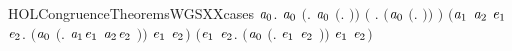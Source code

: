 \newcommand{\HOLCongruenceTheoremsWGSSeven}{\UseVerbatim{HOLCongruenceTheoremsWGSSeven}}
\begin{SaveVerbatim}{HOLCongruenceTheoremsWGSXXcases}
\HOLTokenTurnstile{} \HOLSymConst{\HOLTokenForall{}}\ensuremath{\HOLBoundVar{a}\sb{\mathrm{0}}}.
        \ensuremath{\HOLBoundVar{a}\sb{\mathrm{0}}} \HOLSymConst{\HOLTokenEquiv{}}
       \ensuremath{(}\HOLSymConst{\HOLTokenExists{}}. \ensuremath{\HOLBoundVar{a}\sb{\mathrm{0}}} \HOLSymConst{\ensuremath{=}} \ensuremath{(}\HOLTokenLambda{}. \ensuremath{)}\ensuremath{)} \HOLSymConst{\HOLTokenDisj{}}
       \ensuremath{(}\HOLSymConst{\HOLTokenExists{}} . \ensuremath{(}\ensuremath{\HOLBoundVar{a}\sb{\mathrm{0}}} \HOLSymConst{\ensuremath{=}} \ensuremath{(}\HOLTokenLambda{}. \HOLSymConst{\ensuremath{\ldotp}} \ensuremath{)}\ensuremath{)} \HOLSymConst{\HOLTokenConj{}}  \ensuremath{)} \HOLSymConst{\HOLTokenDisj{}}
       \ensuremath{(}\HOLSymConst{\HOLTokenExists{}}\ensuremath{\HOLBoundVar{a}\sb{\mathrm{1}}} \ensuremath{\HOLBoundVar{a}\sb{\mathrm{2}}} \ensuremath{\HOLBoundVar{e}\sb{\mathrm{1}}} \ensuremath{\HOLBoundVar{e}\sb{\mathrm{2}}}.
            \ensuremath{(}\ensuremath{\HOLBoundVar{a}\sb{\mathrm{0}}} \HOLSymConst{\ensuremath{=}} \ensuremath{(}\HOLTokenLambda{}. \ensuremath{\HOLBoundVar{a}\sb{\mathrm{1}}}\HOLSymConst{\ensuremath{\ldotp}}\ensuremath{\HOLBoundVar{e}\sb{\mathrm{1}}}  \HOLSymConst{\ensuremath{+}} \ensuremath{\HOLBoundVar{a}\sb{\mathrm{2}}}\HOLSymConst{\ensuremath{\ldotp}}\ensuremath{\HOLBoundVar{e}\sb{\mathrm{2}}} \ensuremath{)}\ensuremath{)} \HOLSymConst{\HOLTokenConj{}}  \ensuremath{\HOLBoundVar{e}\sb{\mathrm{1}}} \HOLSymConst{\HOLTokenConj{}}
             \ensuremath{\HOLBoundVar{e}\sb{\mathrm{2}}}\ensuremath{)} \HOLSymConst{\HOLTokenDisj{}}
       \ensuremath{(}\HOLSymConst{\HOLTokenExists{}}\ensuremath{\HOLBoundVar{e}\sb{\mathrm{1}}} \ensuremath{\HOLBoundVar{e}\sb{\mathrm{2}}}. \ensuremath{(}\ensuremath{\HOLBoundVar{a}\sb{\mathrm{0}}} \HOLSymConst{\ensuremath{=}} \ensuremath{(}\HOLTokenLambda{}. \ensuremath{\HOLBoundVar{e}\sb{\mathrm{1}}}  \HOLSymConst{\ensuremath{\mid}} \ensuremath{\HOLBoundVar{e}\sb{\mathrm{2}}} \ensuremath{)}\ensuremath{)} \HOLSymConst{\HOLTokenConj{}}  \ensuremath{\HOLBoundVar{e}\sb{\mathrm{1}}} \HOLSymConst{\HOLTokenConj{}}  \ensuremath{\HOLBoundVar{e}\sb{\mathrm{2}}}\ensuremath{)} \HOLSymConst{\HOLTokenDisj{}}

\end{SaveVerbatim}
